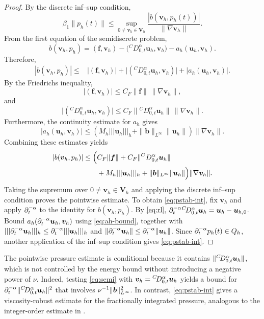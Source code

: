 \begin{proof}
By the discrete inf--sup condition,
\[
\beta_1\|p_h(t)\|
\le
\sup_{0\ne \bm v_h\in \bm  V_h}
\frac{|b(\bm v_h,p_h(t))|}{\|\nabla \bm v_h\|}.
\]
From the first equation of the semidiscrete problem,
\[
b(\bm v_h,p_h)
=
(\bm f,\bm v_h)
-\bigl({}^{C}D_{0,t}^{\alpha}\bm u_h,\bm v_h\bigr)
-a_h(\bm u_h,\bm v_h).
\]
Therefore,
\[
\begin{aligned}
|b(\bm v_h,p_h)|
\le {}&
|(\bm f,\bm v_h)|
+
\bigl|({}^{C}D_{0,t}^{\alpha}\bm u_h,\bm v_h)\bigr|
+
|a_h(\bm u_h,\bm v_h)|.
\end{aligned}
\]
By the Friedrichs inequality,
\[
|(\bm f,\bm v_h)|
\le
C_F\|\bm f\|\,\|\nabla \bm v_h\|,
\]
and
\[
\bigl|({}^{C}D_{0,t}^{\alpha}\bm u_h,\bm v_h)\bigr|
\le
C_F\|{}^{C}D_{0,t}^{\alpha}\bm u_h\|
\,\|\nabla \bm v_h\|.
\]
Furthermore, the continuity estimate for $a_h$ gives
\[
|a_h(\bm u_h,\bm v_h)|
\le
\left(
M_h|||\bm u_h|||_h
+
\|\boldsymbol b\|_{L^\infty}\|\bm u_h\|
\right)
\|\nabla \bm v_h\|.
\]
Combining these estimates yields
\[
\begin{aligned}
|b(\bm v_h,p_h)|
\le
\Bigl(
&C_F\|\bm f\|
+C_F\|{}^{C}D_{0,t}^{\alpha}\bm u_h\|
\\
&+
M_h|||\bm u_h|||_h
+\|\boldsymbol b\|_{L^\infty}\|\bm u_h\|
\Bigr)
\|\nabla \bm v_h\|.
\end{aligned}
\]
Taking the supremum over $0\ne \bm v_h\in \bm V_h$ and applying the discrete inf--sup condition proves the pointwise estimate. To obtain \eqref{eq:pstab-int}, fix $\bm v_h$ and apply $\partial_t^{-\alpha}$ to the identity for $b(\bm v_h,p_h)$. By \eqref{eq:rl}, $\partial_t^{-\alpha}{}^{C}\!D_{0,t}^{\alpha}\bm u_h=\bm u_h-\bm u_{h,0}$. Bound $a_h(\partial_t^{-\alpha}\bm u_h,\bm v_h)$ using \eqref{eq:ah-bound}, together with $|||\partial_t^{-\alpha}\bm u_h|||_h\le\partial_t^{-\alpha}|||\bm u_h|||_h$ and $\|\partial_t^{-\alpha}\bm u_h\|\le\partial_t^{-\alpha}\|\bm u_h\|$. Since $\partial_t^{-\alpha} p_h(t)\in Q_h$, another application of the inf--sup condition gives \eqref{eq:pstab-int}.
\end{proof}
The pointwise pressure estimate is conditional because it contains $\|{}^{C}\!D_{0,t}^{\alpha}\bm u_h\|$, which is not controlled by the energy bound without introducing a negative power of $\nu$. Indeed, testing \eqref{eq:semi} with $\bm v_h={}^{C}\!D_{0,t}^{\alpha}\bm u_h$ yields a bound for $\partial_t^{-\alpha}\|{}^{C}\!D_{0,t}^{\alpha}\bm u_h\|^2$ that involves $\nu^{-1}\|\boldsymbol b\|_{L^\infty}^2$. In contrast, \eqref{eq:pstab-int} gives a viscosity-robust estimate for the fractionally integrated pressure, analogous to the integer-order estimate in \cite{BF07}.





